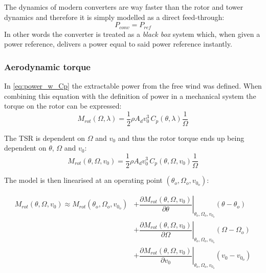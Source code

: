 The dynamics of modern converters are way faster than the rotor and tower dynamics and therefore it is simply modelled as a direct feed-through:
\begin{equation}\label{eq:wtLin_comp_convdft}
	P_{conv} = P_{ref}
\end{equation}
In other words the converter is treated as a \textit{black box} system which, when given a power reference, delivers a power equal to said power reference instantly.

\subsubsection{Aerodynamic torque}
In \cref{eq:power_w_Cp} the extractable power from the free wind was defined. When combining this equation with the definition of power in a mechanical system the torque on the rotor can be expressed:
\begin{equation}\label{eq:wtLin_Mrot_lambda}
	M_{rot}(\Omega, \lambda) = \dfrac{1}{2} \rho A_d v_0^3 \, C_p(\theta, \lambda) \dfrac{1}{\Omega}
\end{equation}

The TSR is dependent on $ \Omega $ and $ v_0 $ and thus the rotor torque ends up being dependent on $ \theta $, $ \Omega $ and $ v_0 $:
\begin{equation}\label{eq:wtLin_Mrot_wind}
	M_{rot}(\theta, \Omega, v_0) = \dfrac{1}{2} \rho A_d v_0^3 \, C_p(\theta, \Omega, v_0) \dfrac{1}{\Omega}
\end{equation}

The model is then linearised at an operating point $ (\theta_o, \Omega_o, v_{0_o}) $:

\begin{align}
	M_{rot}(\theta, \Omega, v_0) \approx M_{rot}(\theta_o, \Omega_o, v_{0_o}) 
	& + \left. \dfrac{\partial M_{rot}(\theta, \Omega, v_0)}{\partial \theta} \right |_{\theta_o, \Omega_o, v_{0_o}} ( \theta-\theta_o) \\
	& + \left. \dfrac{\partial M_{rot}(\theta, \Omega, v_0)}{\partial \Omega} \right |_{\theta_o, \Omega_o, v_{0_o}} ( \Omega-\Omega_o) \\
	& + \left. \dfrac{\partial M_{rot}(\theta, \Omega, v_0)}{\partial v_0} \right |_{\theta_o, \Omega_o, v_{0_o}} ( v_0 - v_{0_o})
\end{align}

%	

